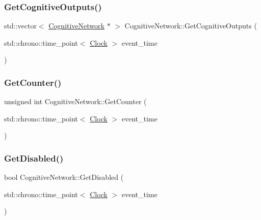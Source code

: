 \subsubsection{\texorpdfstring{Get\+Cognitive\+Outputs()}{GetCognitiveOutputs()}}
{\footnotesize\ttfamily std\+::vector$<$ \mbox{\hyperlink{classCognitiveNetwork}{Cognitive\+Network}} $\ast$ $>$ Cognitive\+Network\+::\+Get\+Cognitive\+Outputs (\begin{DoxyParamCaption}\item[{std\+::chrono\+::time\+\_\+point$<$ \mbox{\hyperlink{universe_8h_a0ef8d951d1ca5ab3cfaf7ab4c7a6fd80}{Clock}} $>$}]{event\+\_\+time }\end{DoxyParamCaption})}

\mbox{\label{classCognitiveNetwork_a160bb447671609eb14b1b8043639ac74}} 
\subsubsection{\texorpdfstring{Get\+Counter()}{GetCounter()}}
{\footnotesize\ttfamily unsigned int Cognitive\+Network\+::\+Get\+Counter (\begin{DoxyParamCaption}\item[{std\+::chrono\+::time\+\_\+point$<$ \mbox{\hyperlink{universe_8h_a0ef8d951d1ca5ab3cfaf7ab4c7a6fd80}{Clock}} $>$}]{event\+\_\+time }\end{DoxyParamCaption})\hspace{0.3cm}{\ttfamily [inline]}}

\mbox{\label{classCognitiveNetwork_aa64c93ecec84b57b25e1fdb173795f9b}} 
\subsubsection{\texorpdfstring{Get\+Disabled()}{GetDisabled()}}
{\footnotesize\ttfamily bool Cognitive\+Network\+::\+Get\+Disabled (\begin{DoxyParamCaption}\item[{std\+::chrono\+::time\+\_\+point$<$ \mbox{\hyperlink{universe_8h_a0ef8d951d1ca5ab3cfaf7ab4c7a6fd80}{Clock}} $>$}]{event\+\_\+time }\end{DoxyParamCaption})\hspace{0.3cm}{\ttfamily [inline]}}

